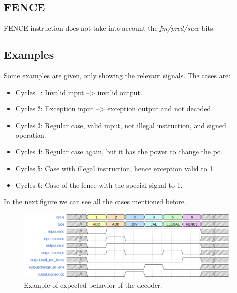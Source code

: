 \subsection{FENCE}
FENCE instruction does not take into account the \textit{fm/pred/succ} bits.


\subsection{Examples}

Some examples are given, only showing the relevant signals. The cases are:

\begin{itemize}
	\item Cycles 1: Invalid input --> invalid output. 
	\item Cycles 2: Exception input --> exception output and not decoded.
	\item Cycles 3: Regular case, valid input, not illegal instruction, and signed operation.
	\item Cycles 4: Regular case again, but it has the power to change the pc.
	\item Cycles 5: Case with illegal instruction, hence exception valid to 1. 
	\item Cycles 6: Case of the fence with the special signal to 1.
\end{itemize}

In the next figure we can see all the cases mentioned before.

\begin{figure}[H]
	\centering
	\includegraphics[width=\textwidth]{Figure/full_example.png}
	\caption{Example of expected behavior of the decoder.}
\end{figure}



